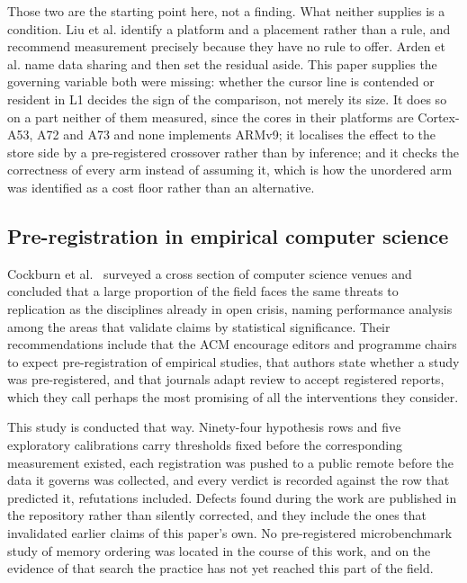 \documentclass[conference]{IEEEtran}
\begin{document}
Those two are the starting point here, not a finding. What neither supplies is a
condition. Liu et al. identify a platform and a placement rather than a rule,
and recommend measurement precisely because they have no rule to offer. Arden et
al. name data sharing and then set the residual aside. This paper supplies the
governing variable both were missing: whether the cursor line is contended or
resident in L1 decides the sign of the comparison, not merely its size. It does
so on a part neither of them measured, since the cores in their platforms are
Cortex-A53, A72 and A73 and none implements ARMv9; it localises the effect to
the store side by a pre-registered crossover rather than by inference; and it
checks the correctness of every arm instead of assuming it, which is how the
unordered arm was identified as a cost floor rather than an alternative.

\subsection{Pre-registration in empirical computer science}

Cockburn et al.~\cite{cockburn2020threats} surveyed a cross section of computer
science venues and concluded that a large proportion of the field faces the same
threats to replication as the disciplines already in open crisis, naming
performance analysis among the areas that validate claims by statistical
significance. Their recommendations include that the ACM encourage editors and
programme chairs to expect pre-registration of empirical studies, that authors
state whether a study was pre-registered, and that journals adapt review to
accept registered reports, which they call perhaps the most promising of all
the interventions they consider.

This study is conducted that way. Ninety-four hypothesis rows and five exploratory
calibrations carry thresholds fixed before the corresponding measurement
existed, each registration was pushed to a public remote before the data it
governs was collected, and every verdict is recorded against the row that
predicted it, refutations included. Defects found during the work are published
in the repository rather than silently corrected, and they include the ones that
invalidated earlier claims of this paper's own. No pre-registered microbenchmark
study of memory ordering was located in the course of this work, and on the
evidence of that search the practice has not yet reached this part of the field.
\end{document}

